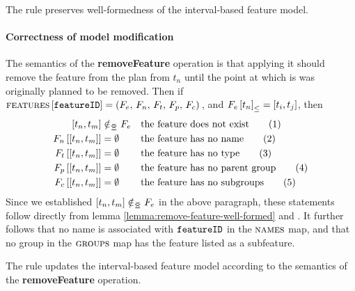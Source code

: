 \begin{lemma}
   The  rule preserves well-formedness of the interval-based feature model. 
   \label{lemma:remove-feature-well-formed}
\end{lemma}

\paragraph{Correctness of model modification}
The semantics of the \textbf{removeFeature} operation is that applying it should remove the feature from the plan from $t_n$ until the point at which is was originally planned to be removed. Then if $\textsc{features} \left[ \texttt{featureID} \right] = \left(F_e,\, F_n,\, F_t,\, F_p,\, F_c\right){}$, and $\containing{F_e}{t_n} = \interval{t_i}{t_j}$, then
\begin{align}
   \interval{t_n}{t_m} &\notinnr F_e && \text{the feature does not exist} \tag{1} \label{remove-feature1}\\
   \lookup{F_n}{\interval{t_n}{t_m}} &= \emptyset && \text{the feature has no name} \tag{2} \label{remove-feature2}\\
   \lookup{F_t}{\interval{t_n}{t_m}} &= \emptyset  && \text{the feature has no type} \tag{3} \label{remove-feature3}\\
   \lookup{F_p}{\interval{t_n}{t_m}} &= \emptyset  && \text{the feature has no parent group} \tag{4} \label{remove-feature4}\\
   \lookup{F_c}{\interval{t_n}{t_m}} &= \emptyset && \text{the feature has no subgroups} \tag{5} \label{remove-feature5}
\end{align}
Since we established $\interval{t_n}{t_m} \notinnr F_e$ in the above paragraph, these
statements follow directly from lemma \vref{lemma:remove-feature-well-formed} and . It further follows that no name is associated with $\texttt{featureID}$ in the $\textsc{names}{}$ map, and that no group in the $\textsc{groups}{}{}$ map has the feature listed as a subfeature.
\\

\begin{lemma}
   The  rule updates the interval-based feature model according to the semantics of the \textbf{removeFeature} operation.
   \label{lemma:remove-feature-mod}
\end{lemma}
